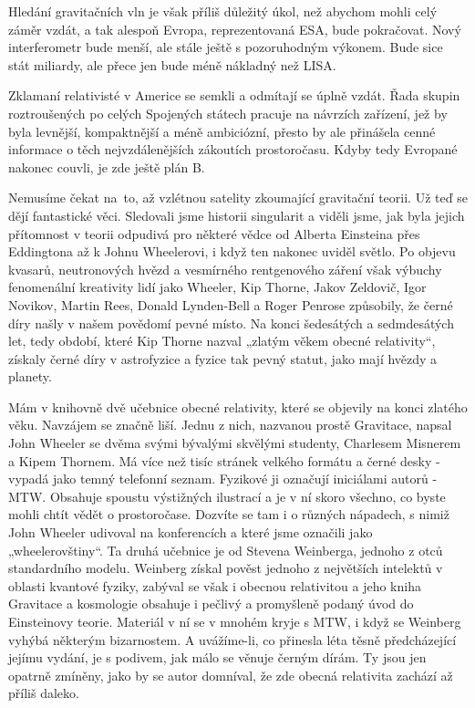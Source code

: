   Hledání gravitačních vln je však příliš důležitý úkol, než abychom mohli celý záměr vzdát, a tak
  alespoň Evropa, reprezentovaná ESA, bude pokračovat. Nový interferometr bude menší, ale stále
  ještě s pozoruhodným výkonem. Bude sice stát miliardy, ale přece jen bude méně nákladný než LISA.
  
  Zklamaní relativisté v Americe se semkli a odmítají se úplně vzdát. Řada skupin roztroušených po
  celých Spojených státech pracuje na návrzích zařízení, jež by byla levnější, kompaktnější a méně
  ambiciózní, přesto by ale přinášela cenné informace o těch nejvzdálenějších zákoutích
  prostoročasu. Kdyby tedy Evropané nakonec couvli, je zde ještě plán B. 
  
  Nemusíme čekat na to, až vzlétnou satelity zkoumající gravitační teorii. Už teď se dějí
  fantastické věci. Sledovali jsme historii singularit a viděli jsme, jak byla jejich přítomnost v
  teorii odpudivá pro některé vědce od Alberta Einsteina přes Eddingtona až k Johnu Wheelerovi, i
  když ten nakonec uviděl světlo. Po objevu kvasarů, neutronových hvězd a vesmírného rentgenového
  záření však výbuchy fenomenální kreativity lidí jako Wheeler, Kip Thorne, Jakov Zeldovič, Igor
  Novikov, Martin Rees, Donald Lynden-Bell a Roger Penrose způsobily, že černé díry našly v našem
  povědomí pevné místo. Na konci šedesátých a sedmdesátých let, tedy období, které Kip Thorne nazval
  „zlatým věkem obecné relativity“, získaly černé díry v astrofyzice a fyzice tak pevný statut, jako
  mají hvězdy a planety. 
  
  Mám v knihovně dvě učebnice obecné relativity, které se objevily na konci zlatého věku. Navzájem
  se značně liší. Jednu z nich, nazvanou prostě Gravitace, napsal John Wheeler se dvěma svými
  bývalými skvělými studenty, Charlesem Misnerem a Kipem Thornem. Má více než tisíc stránek velkého
  formátu a černé desky - vypadá jako temný telefonní seznam. Fyzikové ji označují iniciálami autorů
  - MTW. Obsahuje spoustu výstižných ilustrací a je v ní skoro všechno, co byste mohli chtít vědět o
  prostoročase. Dozvíte se tam i o různých nápadech, s nimiž John Wheeler udivoval na konferencích a
  které jsme označili jako „wheelerovštiny“. Ta druhá učebnice je od Stevena Weinberga, jednoho z
  otců standardního modelu. Weinberg získal pověst jednoho z největších intelektů v oblasti kvantové
  fyziky, zabýval se však i obecnou relativitou a jeho kniha Gravitace a kosmologie obsahuje i
  pečlivý a promyšleně podaný úvod do Einsteinovy teorie. Materiál v ní se v mnohém kryje s MTW, i
  když se Weinberg vyhýbá některým bizarnostem. A uvážíme-li, co přinesla léta těsně předcházející
  jejímu vydání, je s podivem, jak málo se věnuje černým dírám. Ty jsou jen opatrně zmíněny, jako by
  se autor domníval, že zde obecná relativita zachází až příliš daleko. 
  
